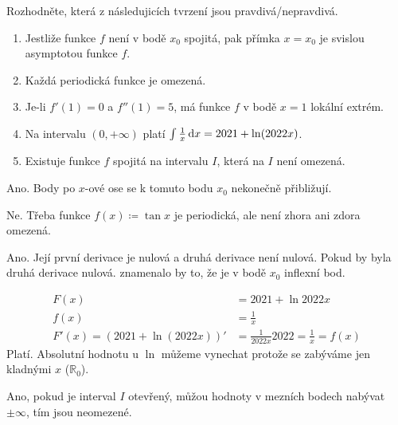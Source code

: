 \begin{tcolorbox}
Rozhodněte, která z následujicích tvrzení jsou pravdivá/nepravdivá.
\begin{enumerate}[
        label=(\alph*), 
        noitemsep,
        topsep=0pt,
        parsep=2pt,
        partopsep=0pt,
        labelwidth=5cm,
        align=right,
        itemindent=1.2cm
    ]
	\item Jestliže funkce $f$ není v bodě $x_0$ spojitá, pak přímka $x= x_0$ je svislou asymptotou funkce $f$.
	\item Každá periodická funkce je omezená.
	\item Je-li $f'(1) = 0$ a $f''(1) = 5$, má funkce $f$ v bodě $x = 1$ lokální extrém.
	\item Na intervalu $(0, +\infty)$ platí $\int \frac{1}{x} \mathop{}\!\mathrm{d}{x} = 2021 + \ln(2022x)$.
	\item Existuje funkce $f$ spojitá na intervalu $I$, která na $I$ není omezená.
\end{enumerate}
\end{tcolorbox}

\begin{tcolorbox}[title=1. otázka]
	Ano. Body po $x$-ové ose se k tomuto bodu $x_0$ nekonečně přibližují.
\end{tcolorbox}


\begin{tcolorbox}[title=2. otázka]
	Ne. Třeba funkce $f(x) \coloneq \tan{x}$ je periodická, ale není zhora ani zdora omezená.
\end{tcolorbox}


\begin{tcolorbox}[title=3. otázka]
	Ano. Její první derivace je nulová a druhá derivace není nulová. Pokud by byla druhá derivace nulová. znamenalo by to, že je v bodě $x_0$ inflexní bod.
\end{tcolorbox}


\begin{tcolorbox}[title=4. otázka]
	\begin{align}
		F(x) &= 2021 + \ln{2022x} \\
		f(x) &= \frac{1}{x} \\
		F'(x) = (2021 + \ln(2022x))' &= \frac{1}{2022x}2022 = \frac{1}{x} = f(x) 
	\end{align}
	Platí. Absolutní hodnotu u $\ln$ můžeme vynechat protože se zabýváme jen kladnými $x$ ($\mathbb{R}_0$).
\end{tcolorbox}


\begin{tcolorbox}[title=5. otázka]
	Ano, pokud je interval $I$ otevřený, můžou hodnoty v mezních bodech nabývat $\pm\infty$, tím jsou neomezené.
\end{tcolorbox}
